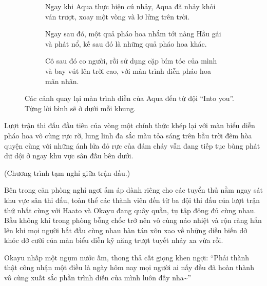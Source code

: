 \documentclass[../main.tex]{subfiles}
\begin{document}
\begin{figure}[H]
  \centering
  \begin{subfigure}[t]{0.45\textwidth}
    \centering
    \caption{Ngay khi Aqua thực hiện cú nhảy, Aqua đã nhảy khỏi ván trượt, xoay một vòng và lơ lửng trên trời.}
  \end{subfigure}
  \quad
  \begin{subfigure}[t]{0.45\textwidth}
    \centering
    \caption{Ngay sau đó, một quả pháo hoa nhắm tới nàng Hầu gái và phát nổ, kế sau đó là những quả pháo hoa khác.}
  \end{subfigure}
  \quad
  \begin{subfigure}[t]{0.45\textwidth}
    \centering
    \caption{Cô sau đó co người, rồi sử dụng cặp bím tóc của mình và bay vút lên trời cao, với màn trình diễn pháo hoa mãn nhãn.}
  \end{subfigure}
  \caption{Các cảnh quay lại màn trình diễn của Aqua đến từ đội ``Into you''. Từng lời bình sẽ ở dưới mỗi khung.}
\end{figure}
Lượt trận thi đấu đầu tiên của vòng một chính thức khép lại với màn biểu diễn pháo hoa vô cùng rực rỡ, lung linh đa sắc màu tỏa sáng trên bầu trời đêm hòa quyện cùng với những ánh lửa đỏ rực của đám cháy vẫn đang tiếp tục bùng phát dữ dội ở ngay khu vực sân đấu bên dưới.

\begin{center}
  (Chương trình tạm nghỉ giữa trận đấu.)
\end{center}

\omk

Bên trong căn phòng nghỉ ngơi ấm áp dành riêng cho các tuyển thủ nằm ngay sát khu vực sân thi đấu, toàn thể các thành viên đến từ ba đội thi đấu của lượt trận thứ nhất cùng với Haato và Okayu đang quây quần, tụ tập đông đủ cùng nhau. Bầu không khí trong phòng bỗng chốc trở nên vô cùng náo nhiệt và rộn ràng hẳn lên khi mọi người bắt đầu cùng nhau bàn tán xôn xao về những diễn biến dở khóc dở cười của màn biểu diễn kỹ năng trượt tuyết nhảy xa vừa rồi.

Okayu nhấp một ngụm nước ấm, thong thả cất giọng khen ngợi: ``Phải thành thật công nhận một điều là ngày hôm nay mọi người ai nấy đều đã hoàn thành vô cùng xuất sắc phần trình diễn của mình luôn đấy nha\~{}''
\end{document}
